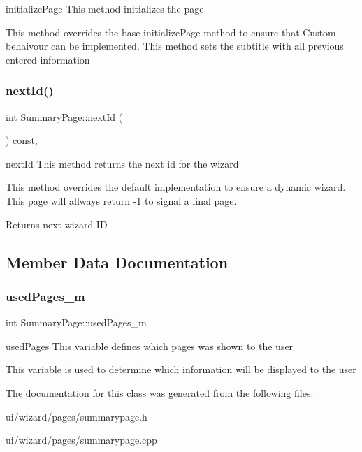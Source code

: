 initialize\+Page This method initializes the page 

This method overrides the base initialize\+Page method to ensure that Custom behaivour can be implemented. This method sets the subtitle with all previous entered information \mbox{\label{class_summary_page_a343463680aad6cf8357c9f13fe23e57d}} 
\subsubsection{\texorpdfstring{next\+Id()}{nextId()}}
{\footnotesize\ttfamily int Summary\+Page\+::next\+Id (\begin{DoxyParamCaption}{ }\end{DoxyParamCaption}) const\hspace{0.3cm}{\ttfamily [override]}, {\ttfamily [protected]}}



next\+Id This method returns the next id for the wizard 

This method overrides the default implementation to ensure a dynamic wizard. This page will allways return -\/1 to signal a final page. \begin{DoxyReturn}{Returns}
next wizard ID 
\end{DoxyReturn}


\subsection{Member Data Documentation}
\mbox{\label{class_summary_page_ac83b1145df468cfd64b81655e2bf7488}} 
\subsubsection{\texorpdfstring{used\+Pages\+\_\+m}{usedPages\_m}}
{\footnotesize\ttfamily int Summary\+Page\+::used\+Pages\+\_\+m\hspace{0.3cm}{\ttfamily [private]}}



used\+Pages This variable defines which pages was shown to the user 

This variable is used to determine which information will be displayed to the user 

The documentation for this class was generated from the following files\+:\begin{DoxyCompactItemize}
\item 
ui/wizard/pages/summarypage.\+h\item 
ui/wizard/pages/summarypage.\+cpp\end{DoxyCompactItemize}
